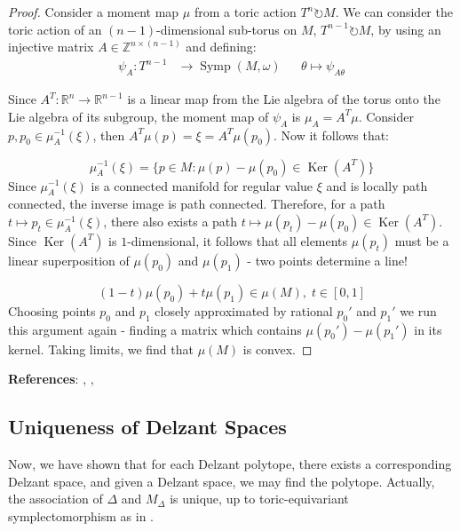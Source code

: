 \begin{proof}
\noindent Consider a moment map $\mu$ from a toric action $T^{n} \circlearrowright M$. We can consider the toric action of an $(n-1)$-dimensional sub-torus on $M$, $T^{n-1} \circlearrowright M$, by using an injective matrix $A \in \mathbb{Z}^{n \times (n-1)}$ and defining:
\begin{align}
\psi_{A}: T^{n-1} &\to \operatorname{Symp}(M, \omega) && \theta \mapsto \psi_{A\theta}
\end{align}

\noindent Since $A^{T}: \mathbb{R}^{n} \to \mathbb{R}^{n-1}$ is a linear map from the Lie algebra of the torus onto the Lie algebra of its subgroup, the moment map of $\psi_{A}$ is $\mu_{A} = A^{T} \mu$. Consider $p, p_{0} \in \mu_{A}^{-1}(\xi)$, then $A^{T} \mu(p) = \xi = A^{T} \mu(p_{0})$. Now it follows that:

\begin{equation}
\mu_{A}^{-1}(\xi) = \{p \in M: \mu(p) - \mu(p_{0}) \in \operatorname{Ker}(A^{T}) \}
\end{equation}
\noindent Since $\mu_{A}^{-1}(\xi)$ is a connected manifold for regular value $\xi$ and is locally path connected, the inverse image is path connected. Therefore, for a path $t \mapsto p_{t} \in \mu_{A}^{-1}(\xi)$, there also exists a path $t \mapsto \mu(p_{t}) - \mu(p_{0}) \in \operatorname{Ker}(A^{T})$. Since $\operatorname{Ker}(A^{T})$ is $1$-dimensional, it follows that all elements $\mu(p_{t})$ must be a linear superposition of $\mu(p_{0})$ and $\mu(p_{1})$ - two points determine a line!

\begin{equation}
(1-t) \mu(p_{0}) + t \mu(p_{1}) \in \mu(M), \; t \in [0,1]
\end{equation}
Choosing points $p_{0}$ and $p_{1}$ closely approximated by rational $p_{0}'$ and $p_{1}'$ we run this argument again - finding a matrix which contains $\mu(p_{0}') - \mu(p_{1}')$ in its kernel. Taking limits, we find that $\mu(M)$ is convex.
\end{proof}

\noindent \textbf{References}: \textcite{Silva2001}, \textcite{Delzant1988}, \textcite{Terek2020}

\subsection{Uniqueness of Delzant Spaces}
Now, we have shown that for each Delzant polytope, there exists a corresponding Delzant space, and given a Delzant space, we may find the polytope. Actually, the association of $\Delta$ and $M_{\Delta}$ is unique, up to toric-equivariant symplectomorphism as in  \textcite{Delzant1988}.

